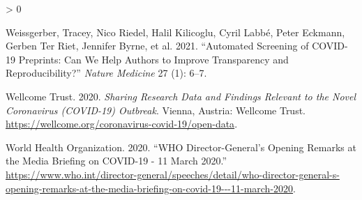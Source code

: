 \documentclass[
]{article}
\newlength{\cslhangindent}
\newenvironment{CSLReferences}[2] %
 {%
  \setlength{\parindent}{0pt}
  \ifodd #1 \everypar{\setlength{\hangindent}{\cslhangindent}}\ignorespaces\fi
  \ifnum #2 > 0
  \setlength{\parskip}{#2\baselineskip}
  \fi
 }%
 {}
\begin{document}
\begin{CSLReferences}{1}{0}
\leavevmode\hypertarget{ref-weissgerber2021automated}{}%
Weissgerber, Tracey, Nico Riedel, Halil Kilicoglu, Cyril Labbé, Peter Eckmann, Gerben Ter Riet, Jennifer Byrne, et al. 2021. {``Automated Screening of COVID-19 Preprints: Can We Help Authors to Improve Transparency and Reproducibility?''} \emph{Nature Medicine} 27 (1): 6--7.

\leavevmode\hypertarget{ref-citeWellcome}{}%
Wellcome Trust. 2020. \emph{Sharing Research Data and Findings Relevant to the Novel Coronavirus (COVID-19) Outbreak}. Vienna, Austria: Wellcome Trust. \url{https://wellcome.org/coronavirus-covid-19/open-data}.

\leavevmode\hypertarget{ref-citeWHOtimeline}{}%
World Health Organization. 2020. {``WHO Director-General's Opening Remarks at the Media Briefing on COVID-19 - 11 March 2020.''} \url{https://www.who.int/director-general/speeches/detail/who-director-general-s-opening-remarks-at-the-media-briefing-on-covid-19---11-march-2020}.

\end{CSLReferences}
\end{document}
